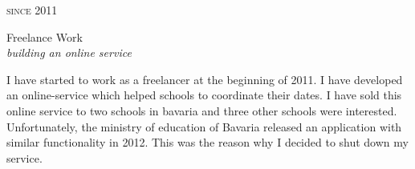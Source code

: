 \documentclass[a4paper,10pt]{article} %
\begin{document}
{\begin{minipage}[t]{0.5\textwidth}

{\raggedleft\textsc{since 2011}\par}

{\raggedright\large Freelance Work\\
\textit{building an online service}\\[5pt]}

\normalsize{I have started to work as a freelancer at the beginning 
of 2011. I have developed an online-service which helped
schools to coordinate their dates. I have sold this online service to
two schools in bavaria and three other schools were interested. 
Unfortunately, the ministry of education of Bavaria 
released an application with similar functionality in
2012. This was the reason why I decided to shut down my service.}\\







\end{minipage} %
\hfill
\begin{minipage}[t]{0.44\textwidth} 
\vspace{0pt} %



\end{minipage}}
\end{document}
